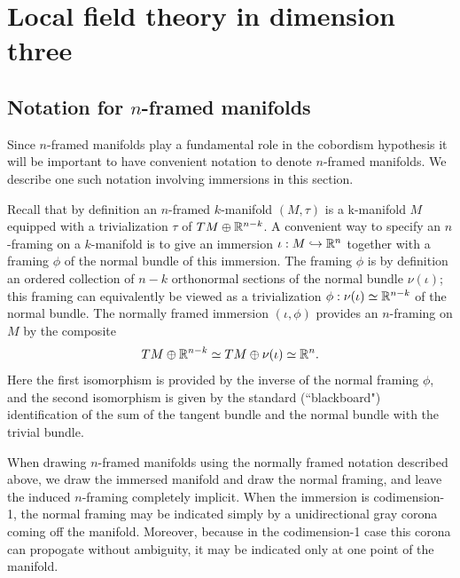 \documentclass{amsart}
\begin{document}
\section{Local field theory in dimension three} \label{sec-lft}


\subsection{Notation for $n$-framed manifolds} 

Since $n$-framed manifolds play a fundamental role in the cobordism hypothesis it will be important to have convenient notation to denote $n$-framed manifolds.  We describe one such notation involving immersions in this section.

Recall that by definition an $n$-framed $k$-manifold $(M,\tau)$ is a k-manifold $M$ equipped with a trivialization $\tau$ of $TM \oplus \mathbb R^{n-k}$.  A convenient way to specify an $n$-framing on a $k$-manifold is to give an immersion $\iota: M \hookrightarrow \mathbb R^n$ together with a framing $\phi$ of the normal bundle of this immersion.  The framing $\phi$ is by definition an ordered collection of $n-k$ orthonormal sections of the normal bundle $\nu(\iota)$; this framing can equivalently be viewed as a trivialization $\phi: \nu(\iota) \simeq \mathbb R^{n-k}$ of the normal bundle.  The normally framed immersion $(\iota, \phi)$ provides an $n$-framing on $M$ by the composite
\[TM \oplus \mathbb R^{n-k} \simeq TM \oplus \nu(\iota) \simeq  \mathbb R^n.\]
Here the first isomorphism is provided by the inverse of the normal framing $\phi$, and the second isomorphism is given by the standard (``blackboard") identification of the sum of the tangent bundle and the normal bundle with the trivial bundle.

When drawing $n$-framed manifolds using the normally framed notation described above, we draw the immersed manifold and draw the normal framing, and leave the induced $n$-framing completely implicit.  When the immersion is codimension-1, the normal framing may be indicated simply by a unidirectional gray corona coming off the manifold.  Moreover, because in the codimension-1 case this corona can propogate without ambiguity, it may be indicated only at one point of the manifold.
\end{document}
